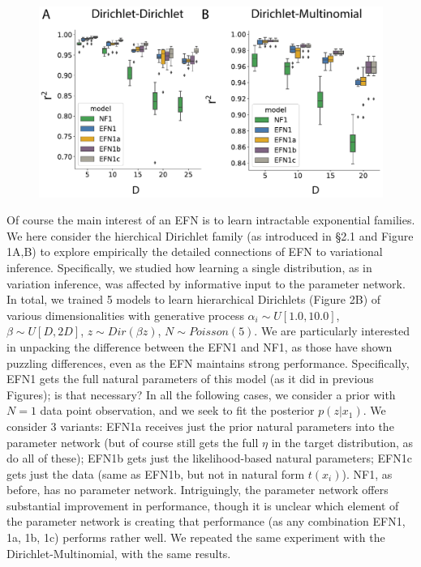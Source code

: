 \documentclass[twoside]{article}
\begin{document}
\begin{figure}
\centering
\includegraphics[scale=0.25]{figs/fig4/fig4.pdf}
\label{fig:test1}
\end{figure}

Of course the main interest of an EFN is to learn intractable exponential families.  
We here consider the hierchical Dirichlet family (as introduced in \S2.1 and Figure 1A,B) to explore empirically the detailed connections of EFN to variational inference.  Specifically, we studied how learning a single distribution, as in variation inference, was affected by informative input to the parameter network.  In total, we trained 5 models to learn hierarchical Dirichlets (Figure 2B) of various dimensionalities with generative process $\alpha_i \sim U\left[ 1.0, 10.0\right]$, $\beta \sim U\left[D, 2D\right]$, $z \sim Dir(\beta z)$, $N \sim Poisson(5)$.  We are particularly interested in unpacking the difference between the EFN1 and NF1, as those have shown puzzling differences, even as the EFN maintains strong performance.  Specifically, EFN1 gets the full natural parameters of this model (as it did in previous Figures); is that necessary?  In all the following cases, we consider a prior with $N=1$ data point observation, and we seek to fit the posterior $p(z|x_1)$.  We consider 3 variants: EFN1a receives just the prior natural parameters into the parameter network (but of course still gets the full $\eta$ in the target distribution, as do all of these); EFN1b gets just the likelihood-based natural parameters; EFN1c gets just the data (same as EFN1b, but not in natural form $t(x_i)$).  NF1, as before, has no parameter network.  Intriguingly, the parameter network offers substantial improvement in performance, though it is unclear which element of the parameter network is creating that performance (as any combination EFN1, 1a, 1b, 1c) performs rather well.  We repeated the same experiment with the Dirichlet-Multinomial, with the same results.  
\end{document}
